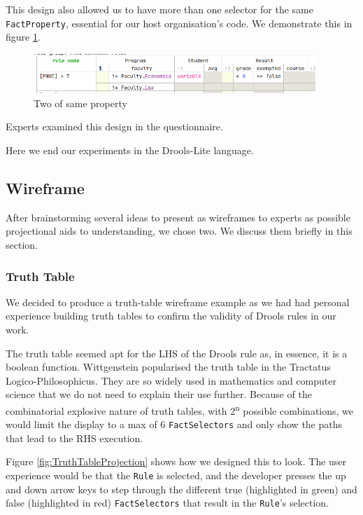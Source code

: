 This design also allowed us to have more than one selector for the same \texttt{FactProperty}, essential for our host organisation's code.
We demonstrate this in figure \ref{fig:TwoProperties}.

\begin{figure}
    \centering
    \includegraphics[width=0.95\textwidth]{Sections/images/spreadsheetTwoProperties.png} 
    \caption{Two of same property}
    \label{fig:TwoProperties}
\end{figure}

Experts examined this design in the questionnaire.

Here we end our experiments in the Drools-Lite language.

\subsection{Wireframe}

After brainstorming several ideas to present as wireframes to experts as possible projectional aids to understanding, we chose two.
We discuss them briefly in this section.

\subsubsection{Truth Table}
We decided to produce a truth-table wireframe example as we had had personal experience building truth tables to confirm the validity of Drools rules in our work.

The truth table seemed apt for the LHS of the Drools rule as, in essence, it is a boolean function.
Wittgenstein popularised the truth table in the Tractatus Logico-Philosophicus\cite{wittgenstein2013tractatus}.
They are so widely used in mathematics and computer science that we do not need to explain their use further.
Because of the combinatorial explosive nature of truth tables, with 2\textsuperscript{n} possible combinations, we would limit the display to a max of 6 \texttt{FactSelectors} and only show the paths that lead to the RHS execution.

Figure \ref{fig:TruthTableProjection} shows how we designed this to look.
The user experience would be that the \texttt{Rule} is selected, and the developer presses the up and down arrow keys to step through the different true (highlighted in green) and false (highlighted in red) \texttt{FactSelectors} that result in the \texttt{Rule}'s selection.

